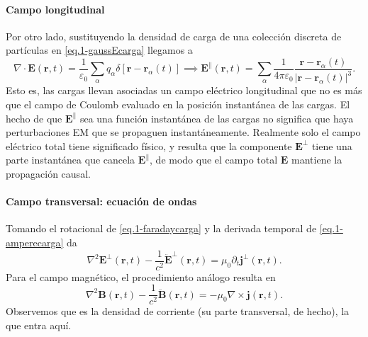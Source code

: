 \paragraph{Campo longitudinal} Por otro lado, sustituyendo la densidad de carga de una colección discreta de partículas en \cref{eq.1-gaussEcarga} llegamos a
\begin{equation}
    \label{eq.1-Elongitudinal_sol}
    \nabla\cdot\mathbf{E}(\mathbf{r}, t) = \frac{1}{\varepsilon_0}\sum_\alpha q_\alpha \delta[\mathbf{r} - \mathbf{r}_\alpha(t)] \implies \mathbf{E}^\parallel(\mathbf{r}, t) = \sum_\alpha \frac{1}{4\pi\varepsilon_0} \frac{\mathbf{r}-\mathbf{r}_\alpha(t)}{\left|\mathbf{r}-\mathbf{r}_\alpha(t)\right|^3}.
\end{equation}
Esto es, las cargas llevan asociadas un campo eléctrico longitudinal que no es más que el campo de Coulomb evaluado en la posición instantánea de las cargas. El hecho de que \(\mathbf{E}^\parallel\) sea una función instantánea de las cargas no significa que haya perturbaciones EM que se propaguen instantáneamente. Realmente solo el campo eléctrico total tiene significado físico, y resulta que la componente \(\mathbf{E}^\perp\) tiene una parte instantánea que cancela \(\mathbf{E}^\parallel\), de modo que el campo total \(\mathbf{E}\) mantiene la propagación causal.

\paragraph{Campo transversal: ecuación de ondas} Tomando el rotacional de \cref{eq.1-faradaycarga} y la derivada temporal de \cref{eq.1-amperecarga} da 
\begin{equation}
    \label{eq.1-ondas_Etransversal}
    \nabla^2 \mathbf{E}^\perp(\mathbf{r}, t) - \frac{1}{c^2}\ddot{\mathbf{E}}^\perp(\mathbf{r}, t) = \mu_0 \partial_t \mathbf{j}^\perp(\mathbf{r}, t).
\end{equation}
Para el campo magnético, el procedimiento análogo resulta en
\begin{equation}
    \nabla^2 \mathbf{B}(\mathbf{r}, t) - \frac{1}{c^2}\ddot{\mathbf{B}}(\mathbf{r}, t) = -\mu_0 \nabla\times\mathbf{j}(\mathbf{r}, t).
\end{equation}
Observemos que es la densidad de corriente (su parte transversal, de hecho), la que entra aquí. 

